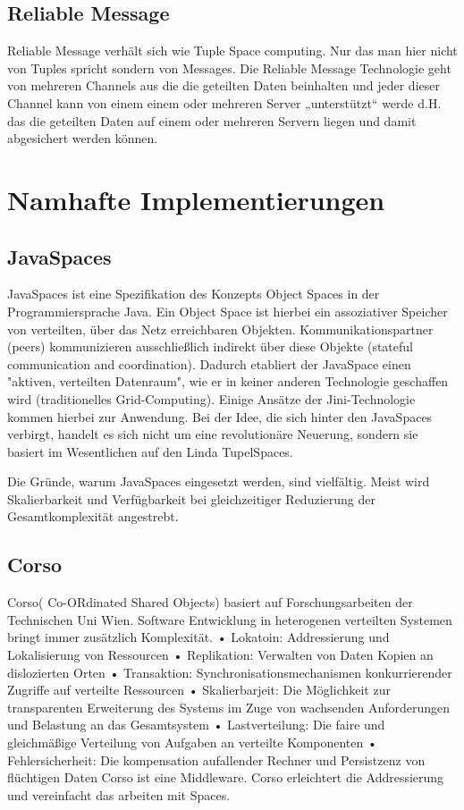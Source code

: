 \documentclass[a4paper,12pt]{scrreprt}
\begin{document}
		\section{Reliable Message}
			
			Reliable Message verhält sich wie Tuple Space computing. Nur das man hier nicht von Tuples spricht sondern von Messages.  Die Reliable Message Technologie geht von mehreren Channels aus die die geteilten Daten beinhalten und jeder dieser Channel kann von einem einem oder mehreren Server „unterstützt“ werde d.H.  das die geteilten Daten auf einem oder mehreren Servern liegen und damit abgesichert werden können. 
			
	
\chapter{Namhafte Implementierungen}
	\section{JavaSpaces}
		JavaSpaces ist eine Spezifikation des Konzepts Object Spaces in der Programmiersprache Java. Ein Object Space ist hierbei ein assoziativer Speicher von verteilten, über das Netz erreichbaren Objekten. Kommunikationspartner (peers) kommunizieren ausschließlich indirekt über diese Objekte (stateful communication and coordination). Dadurch etabliert der JavaSpace einen "aktiven, verteilten Datenraum", wie er in keiner anderen Technologie geschaffen wird (traditionelles Grid-Computing). Einige Ansätze der Jini-Technologie kommen hierbei zur Anwendung. Bei der Idee, die sich hinter den JavaSpaces verbirgt, handelt es sich nicht um eine revolutionäre Neuerung, sondern sie basiert im Wesentlichen auf den Linda TupelSpaces.
		
		Die Gründe, warum JavaSpaces eingesetzt werden, sind vielfältig. Meist wird Skalierbarkeit und Verfügbarkeit bei gleichzeitiger Reduzierung der Gesamtkomplexität angestrebt.
		
		
		\section{Corso}
			Corso( Co-ORdinated Shared Objects) basiert auf Forschungsarbeiten der Technischen Uni Wien.
			Software Entwicklung in heterogenen verteilten Systemen bringt immer zusätzlich Komplexität.
			•	Lokatoin: Addressierung und Lokalisierung von Ressourcen
			•	Replikation: Verwalten von Daten Kopien an dislozierten Orten
			•	Transaktion: Synchronisationsmechanismen konkurrierender Zugriffe auf verteilte Ressourcen
			•	Skalierbarjeit: Die Möglichkeit zur transparenten Erweiterung des Systems im Zuge von wachsenden Anforderungen und Belastung an das Gesamtsystem
			•	Lastverteilung: Die faire und gleichmäßige Verteilung von Aufgaben an verteilte Komponenten
			•	Fehlersicherheit:  Die kompensation aufallender Rechner und Persistzenz von flüchtigen Daten
			Corso ist eine Middleware. Corso erleichtert die Addressierung und vereinfacht das arbeiten mit Spaces.
			
\end{document}
